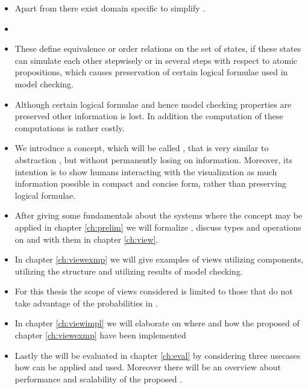 \documentclass[preview]{standalone}
\begin{document}
\begin{itemize}
	\item Apart from  there exist domain specific to simplify \mdpsN. 
	\item 
	\item These define equivalence or order relations on the set of states, if these states can simulate each other stepwisely or in several steps with respect to atomic propositions, which causes preservation of certain logical formulae used in model checking.
	\item Although certain logical formulae and hence model checking properties are preserved other information is lost. In addition the computation of these computations is rather costly.
	\item We introduce a concept, which will be called \viewN, that is very similar to abstraction \cite[pp. 499]{Baier2008}, but without permanently losing on information. Moreover, its intention is to show humans interacting with the visualization as much information possible in compact and concise form, rather than preserving logical formulae.
	\item After giving some fundamentals about the systems where the concept \viewN may be applied in chapter \ref{ch:prelim} we will formalize \viewsN, discuss types and operations on and with them in chapter \ref{ch:view}.
	\item  In chapter \ref{ch:viewexmp} we will give examples of views utilizing \chgphN components, \viewsN utilizing the \chgphN structure and \viewsN utilizing results of model checking.
	\item For this thesis the scope of views considered is limited to those that do not take advantage of the probabilities in \chgphsN.
	\item In chapter \ref{ch:viewimpl} we will elaborate on where and how the proposed \viewsN of chapter \ref{ch:viewexmp} have been implemented
	\item Lastly the \viewsN will be evaluated in chapter \ref{ch:eval} by considering three usecases how \viewsN can be applied and used. Moreover there will be an overview about performance and scalability of the proposed \viewsN. 
	
\end{itemize}
\end{document}
